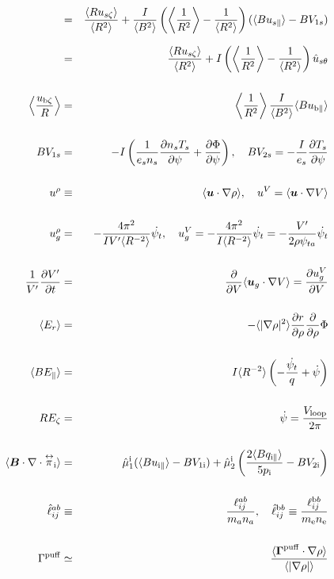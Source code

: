 \documentclass[11pt]{article}
\def\bvec#1{\leavevmode\hbox{\boldmath$#1$}}
\let\vec=\bvec
\def\r#1{{\rm#1}}
\def\ave#1{\left\langle#1\right\rangle}
\def\aves#1{\langle#1\rangle}
\def\dd#1#2{\frac{\partial #1}{\partial #2}}
\def\tensor#1{\mathord{\displaystyle\mathop{#1}^\leftrightarrow}}
\def\para{\parallel}
\def\ddrho{\frac{\partial}{\partial\rho}}
\def\psid{\dot{\psi}}
\def\psit{\psi_t}
\def\psitd{\dot{\psit}}
\def\ubzt{u_{\r{b}\zeta}}
\def\uszt{u_{s\zeta}}
\def\ubpara{u_{\r{b}\para}}
\def\uspara{u_{s\para}}
\def\ugrho{u_{g}^\rho}
\def\ugV{u_{g}^V}
\def\Er{E_r}
\begin{document}
\begin{eqnarray}
%
  &=& \frac{\aves{R\uszt}}{\aves{R^2}}
%
  + \frac{I}{\aves{B^2}} \left(  \ave{\frac{1}{R^2}}
			      - \frac{1}{\aves{R^2}} \right)
    (\aves{B\uspara} - BV_{1s})
\nonumber\\[2.5mm]
%
  &=& \frac{\aves{R\uszt}}{\aves{R^2}}
%
  + I \left(  \ave{\frac{1}{R^2}}
			       - \frac{1}{\aves{R^2}} \right) \hat{u}_{s\theta}
\nonumber\\[5mm]
  \ave{\frac{\ubzt}{R}} &=& 
%
  \ave{\frac{1}{R^2}} \frac{I}{\aves{B^2}}\aves{B\ubpara}
\\[5mm]
  B V_{1s} &=&
%
 - I \left( \frac{1}{e_s n_s} \dd{n_s T_s}{\psi} + \dd{\Phi}{\psi}\right),
\quad
  B V_{2s} =
%
 - \frac{I}{e_s} \dd{T_s}{\psi}
\\[5mm]
  u^\rho &\equiv&
%
  \aves{ \vec{u} \cdot \nabla\rho },
%
  \quad u^V = \aves{ \vec{u} \cdot \nabla V }
\\[5mm]
  \ugrho &=&
%
  - \frac{4\pi^2}{IV'\aves{R^{-2}}} \psitd,
%
  \quad \ugV = - \frac{4\pi^2}{I\aves{R^{-2}}} \psitd = - \frac{V'}{2\rho\psi_{ta}}\psitd
\\[5mm]
  \frac{1}{V'}\dd{V'}{t} &=&
%
  \dd{}{V}\aves{\vec{u}_g\cdot\nabla V} = \dd{u_g^V}{V}
\\[5mm]
  \aves{\Er} &=&
%
  - \aves{|\nabla\rho|^2} \dd{r}{\rho} \ddrho \Phi
\\[5mm]
  \aves{B E_\para} &=&
%
  I \aves{R^{-2}} \left( - \frac{\psitd}{q} + \psid \right)
\\[5mm]
  R E_\zeta &=&
%
  \psid
%
  = \frac{V_\r{loop}}{2\pi}
\\[5mm]
  \aves{\vec{B}\cdot\nabla\cdot\tensor{\pi}_\r{i}} &=&
%
  \hat{\mu}_1^\r{i} ( \aves{Bu_{\r{i}\para}} - BV_{1\r{i}}) 
%
  + \hat{\mu}_2^\r{i} \left( \frac{2\aves{Bq_{\r{i}\para}}}{5p_\r{i}} -
		       BV_{2\r{i}}\right)
\\[5mm]
  \hat{\ell}_{ij}^{ab} &\equiv& \frac{\ell_{ij}^{ab}}{m_an_a},
  \quad
  \hat{\ell}_{ij}^{\r{b}b} \equiv \frac{\ell_{ij}^{\r{b}b}}{m_\r{e}n_\r{e}}
\\[5mm]
  \Gamma^\r{puff} &\simeq& \frac{\aves{\vec{\Gamma}^\r{puff}\cdot\nabla\rho}}{\aves{|\nabla\rho|}}
\end{eqnarray}
\end{document}
